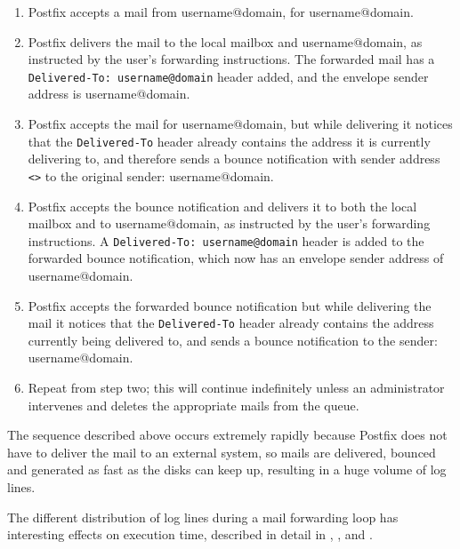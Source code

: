 \begin{enumerate}

    \item Postfix accepts a mail from username@domain, for username@domain.

    \item Postfix delivers the mail to the local mailbox and
        username@domain, as instructed by the user's forwarding
        instructions. The forwarded mail has a
        \texttt{Delivered-To:~username@domain} header added, and the
        envelope sender address is username@domain.

    \item Postfix accepts the mail for username@domain, but while
        delivering it notices that the \texttt{Delivered-To} header already
        contains the address it is currently delivering to, and therefore
        sends a bounce notification with sender address \texttt{<>} to
        the original sender: username@domain.

    \item Postfix accepts the bounce notification and delivers it to both
        the local mailbox and to username@domain, as instructed by the
        user's forwarding instructions.  A
        \texttt{Delivered-To:~username@domain} header is added to the
        forwarded bounce notification, which now has an envelope sender
        address of username@domain.

    \item Postfix accepts the forwarded bounce notification but while
        delivering the mail it notices that the \texttt{Delivered-To}
        header already contains the address currently being delivered to,
        and sends a bounce notification to the sender: username@domain.

    \item Repeat from step two; this will continue indefinitely unless an
        administrator intervenes and deletes the appropriate mails from the
        queue.

\end{enumerate}

The sequence described above occurs extremely rapidly because Postfix does
not have to deliver the mail to an external system, so mails are delivered,
bounced and generated as fast as the disks can keep up, resulting in a huge
volume of log lines.

The different distribution of log lines during a mail forwarding loop has
interesting effects on execution time, described in detail in
, , and .

